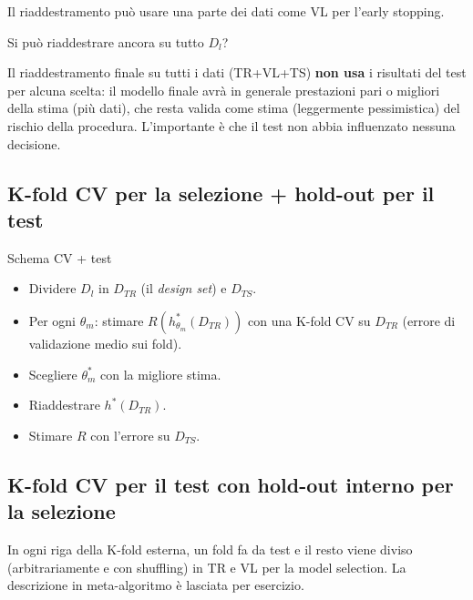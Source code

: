 Il riaddestramento può usare una parte dei dati come VL per l'early
stopping.

\begin{boxquestion}{Si può riaddestrare ancora su tutto \(D_l\)?}

Il riaddestramento finale su tutti i dati (TR+VL+TS) \textbf{non usa} i
risultati del test per alcuna scelta: il modello finale avrà in generale
prestazioni pari o migliori della stima (più dati), che resta valida
come stima (leggermente pessimistica) del rischio della procedura.
L'importante è che il test non abbia influenzato nessuna decisione.

\end{boxquestion}

\subsection{K-fold CV per la selezione + hold-out per il
test}\label{k-fold-cv-per-la-selezione-hold-out-per-il-test}

\begin{boxabstract}{Schema CV + test}

\begin{itemize}
\tightlist
\item
  Dividere \(D_l\) in \(D_{TR}\) (il \emph{design set}) e \(D_{TS}\).
\item
  Per ogni \(\theta_m\): stimare \(R(h^*_{\theta_m}(D_{TR}))\) con una
  K-fold CV su \(D_{TR}\) (errore di validazione medio sui fold).
\item
  Scegliere \(\theta^*_m\) con la migliore stima.
\item
  Riaddestrare \(h^*(D_{TR})\).
\item
  Stimare \(R\) con l'errore su \(D_{TS}\).
\end{itemize}

\end{boxabstract}

\subsection{K-fold CV per il test con hold-out interno per la
selezione}\label{k-fold-cv-per-il-test-con-hold-out-interno-per-la-selezione}

In ogni riga della K-fold esterna, un fold fa da test e il resto viene
diviso (arbitrariamente e con shuffling) in TR e VL per la model
selection. La descrizione in meta-algoritmo è lasciata per esercizio.

